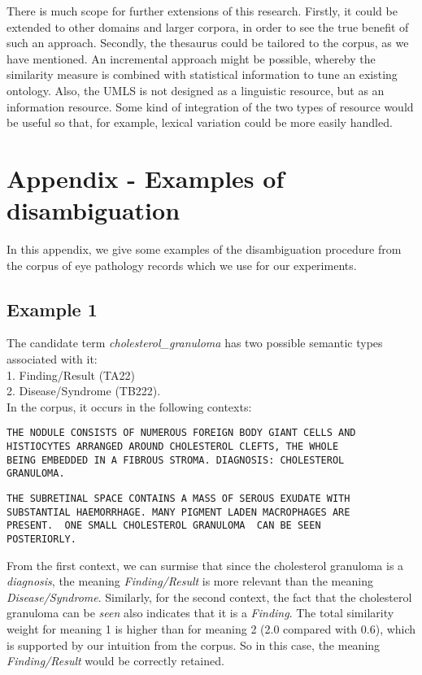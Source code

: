 There is much scope for further extensions of this research. Firstly,
it could be extended to other domains and larger corpora, in order to
see the true benefit of such an approach. Secondly, the thesaurus
could be tailored to the corpus, as we have mentioned. An
incremental approach might be possible, whereby the similarity measure
is combined with statistical information to tune an existing
ontology. Also, the UMLS is not designed as a linguistic resource, but
as an information resource. Some kind of integration of the two types
of resource would be useful so that, for example, lexical variation
could be more easily handled.

\section{Appendix - Examples of disambiguation}
In this appendix, we give some
examples of the disambiguation procedure from the corpus of eye
pathology records which we use for our experiments.

\subsection{Example 1}
The candidate term {\it cholesterol\_granuloma} has two possible
semantic types associated with it: \\
1. Finding/Result (TA22)\\
2. Disease/Syndrome (TB222).\\
In the corpus, it occurs in the following contexts:
\begin{verbatim}
THE NODULE CONSISTS OF NUMEROUS FOREIGN BODY GIANT CELLS AND 
HISTIOCYTES ARRANGED AROUND CHOLESTEROL CLEFTS, THE WHOLE 
BEING EMBEDDED IN A FIBROUS STROMA. DIAGNOSIS: CHOLESTEROL 
GRANULOMA.
\end{verbatim}
\begin{verbatim}
THE SUBRETINAL SPACE CONTAINS A MASS OF SEROUS EXUDATE WITH 
SUBSTANTIAL HAEMORRHAGE. MANY PIGMENT LADEN MACROPHAGES ARE 
PRESENT.  ONE SMALL CHOLESTEROL GRANULOMA  CAN BE SEEN 
POSTERIORLY. 
\end{verbatim}
From the first context, we can surmise that since the cholesterol granuloma is a
{\it diagnosis}, the meaning {\it Finding/Result} is more relevant than
the meaning {\it Disease/Syndrome}. Similarly, for the second
context, the fact that the cholesterol granuloma can be {\it seen}
also indicates that it is a {\it Finding}. The total similarity weight for
meaning 1 is higher than for meaning 2 (2.0 compared with 0.6), which
is supported by our intuition from the corpus. So in this case, the
meaning {\it Finding/Result} would be correctly retained. 

